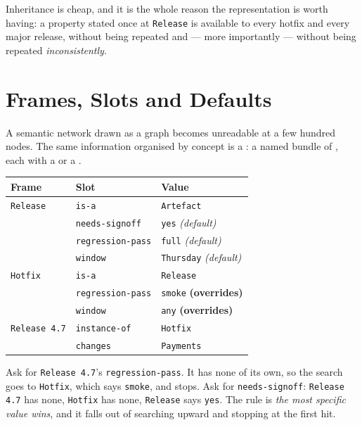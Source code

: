 Inheritance is cheap, and it is the whole reason the representation is worth
having: a property stated once at \texttt{Release} is available to every hotfix and
every major release, without being repeated and --- more importantly --- without
being repeated \emph{inconsistently}.

\section{Frames, Slots and Defaults}

A semantic network drawn as a graph becomes unreadable at a few hundred nodes. The
same information organised by concept is a : a named bundle of
, each with a  or a .

\begin{examplebox}
\begin{tabular}{@{}L{3.0cm}L{5.1cm}L{5.9cm}@{}}
\toprule
\textbf{Frame} & \textbf{Slot} & \textbf{Value} \\
\midrule
\texttt{Release} & \texttt{is-a} & \texttt{Artefact} \\
 & \texttt{needs-signoff} & \texttt{yes} \emph{(default)} \\
 & \texttt{regression-pass} & \texttt{full} \emph{(default)} \\
 & \texttt{window} & \texttt{Thursday} \emph{(default)} \\
\midrule
\texttt{Hotfix} & \texttt{is-a} & \texttt{Release} \\
 & \texttt{regression-pass} & \texttt{smoke} \quad\textbf{(overrides)} \\
 & \texttt{window} & \texttt{any} \quad\textbf{(overrides)} \\
\midrule
\texttt{Release 4.7} & \texttt{instance-of} & \texttt{Hotfix} \\
 & \texttt{changes} & \texttt{Payments} \\
\bottomrule
\end{tabular}
\end{examplebox}

Ask for \texttt{Release 4.7}'s \texttt{regression-pass}. It has none of its own, so
the search goes to \texttt{Hotfix}, which says \texttt{smoke}, and stops. Ask for
\texttt{needs-signoff}: \texttt{Release 4.7} has none, \texttt{Hotfix} has none,
\texttt{Release} says \texttt{yes}. The rule is \emph{the most specific value
wins}, and it falls out of searching upward and stopping at the first hit.

